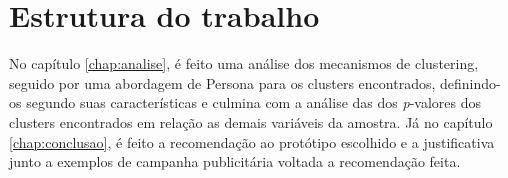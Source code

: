 \section {Estrutura do trabalho}

No capítulo \ref{chap:analise}, é feito uma análise dos mecanismos de clustering, seguido por
uma abordagem de Persona para os clusters encontrados, definindo-os segundo suas características e
culmina com a análise das dos \emph{p}-valores dos clusters encontrados em relação as demais variáveis 
da amostra. Já no capítulo \ref{chap:conclusao}, é feito a recomendação ao protótipo escolhido e a
justificativa junto a exemplos de campanha publicitária voltada a recomendação feita.
